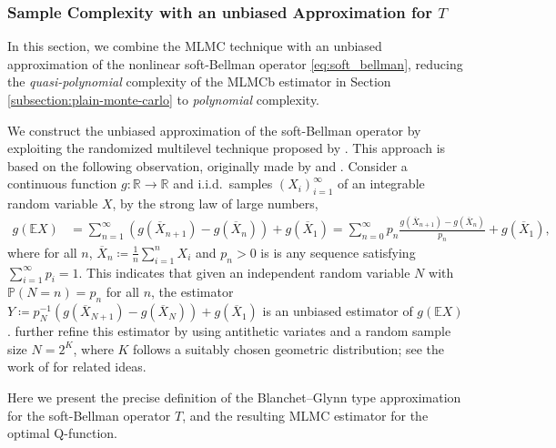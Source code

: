 \documentclass[11pt]{article}
\numberwithin{equation}{section}
\theoremstyle{definition}
\theoremstyle{remark}
\def\R{{\mathbb R}}
\newcommand{\citet}{\cite}
\begin{document}
 

\subsubsection{Sample Complexity with an unbiased Approximation for \texorpdfstring{$T$}{T}}

 
\label{subsection:unbiased-monte-carlo}





 In this section, we combine the MLMC technique with an unbiased approximation of the {nonlinear} soft-Bellman operator \eqref{eq:soft_bellman}, reducing the \emph{quasi-polynomial} complexity of the MLMCb estimator in Section \ref{subsection:plain-monte-carlo} to \emph{polynomial} complexity.

 We construct 
the unbiased approximation of the soft-Bellman operator by exploiting 
   the randomized multilevel technique   proposed  by
  \citet{blanchet2015unbiased}. 
  This approach is based on the following observation, originally made by  
  \citet{mcleish2011general} and \citet{rhee2012new}.   
  Consider 
  a continuous function $g:\R\to \R$
and i.i.d.~samples $(X_i)_{i=1}^\infty$ of an integrable random variable $X$,
by the strong law of large numbers,
\[
\begin{aligned}
g(\mathbb E X) &= \sum_{n = 1}^{\infty} \left(g(\overline{X}_{n + 1}) - g(\overline{X}_n)\right) + g(\overline{X}_1)= \sum_{n = 0}^{\infty} p_n\frac{g(\overline{X}_{n + 1}) - g(\overline{X}_n)}{p_n} + g(\overline{X}_1),
\end{aligned}
\]
where  for all $n$, $\overline{X}_n \coloneqq \frac{1}{n}\sum_{i=1}^n X_i$ and $p_n>0$ is is any sequence satisfying  
$\sum_{i=1}^\infty p_i=1$. This indicates that given  an independent random variable     $N$  with $\mathbb P(N=n)=p_n$ for all $n$,     the estimator 
$ Y\coloneqq p_N^{-1}\left(g(\overline{X}_{N+1}) - g(\overline{X}_N)\right) + g(\overline{X}_1)
$    is an unbiased estimator of $g(\mathbb E X)$. 
\citet{blanchet2015unbiased} further refine this  estimator by using antithetic variates and a random sample size  $N=2^K$, 
where $K$  follows a suitably chosen geometric distribution;
see the work of \citet{bujok2015multilevel, rhee2015unbiased}
for related ideas. 

  
Here we present the precise definition of the Blanchet–Glynn  
type approximation for the soft-Bellman operator $T$, and the resulting MLMC estimator for the optimal Q-function.
\end{document}

